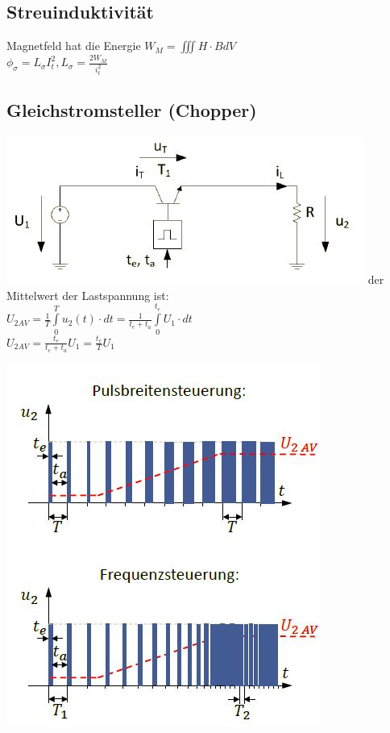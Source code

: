 \subsection{Streuinduktivität}
Magnetfeld hat die Energie $W_{M} = \iiint H \cdot B dV $ \\
$\phi_{\sigma} = L_{\sigma}I_{t}^2, L_{\sigma}= \frac{2W_{M}}{i_{t}^2}$

\subsection{Gleichstromsteller (Chopper)}


  \begin{minipage}{0.5 \linewidth}
    \includegraphics[width = \linewidth]{./pictures/gleichstromschalter3}
    der Mittelwert der Lastspannung ist:\\
    $U_{2 AV} = \frac{1}{T}\int\limits_{0}^{T}u_{2}(t)\cdot dt= \frac{1}{t_{e}+t_{a}}\int\limits_{0}^{t_{e}}U_{1}\cdot dt$\\
    $U_{2 AV} = \frac{t_{e}}{t_{e}+t_{a}}U_{1}= \frac{t_{e}}{T}U_{1}$
  \end{minipage}
  \hfill
  \begin{minipage}{0.5 \linewidth}
    \includegraphics[width = \linewidth]{./pictures/gleichstromschalter4}
  \end{minipage}
